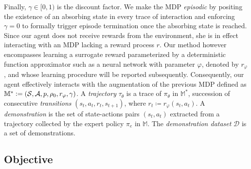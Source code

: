 Finally, $\gamma \in [0, 1)$ is the discount factor.
We make the MDP \emph{episodic}
by positing the existence of an absorbing state in every trace of interaction and
enforcing $\gamma = 0$ to formally trigger episode termination
once the absorbing state is reached.
Since our agent does not receive rewards from the environment,
she is in effect interacting with an MDP lacking a reward process $r$.
Our method however encompasses learning a surrogate reward parameterized
by a deterministic function approximator
such as a neural network with parameter $\varphi$, denoted by $r_\varphi$, and
whose learning procedure will be reported subsequently.
Consequently, our agent effectively interacts with the augmentation of the previous MDP defined as
$\mathbb{M}^* \vcentcolon= (\mathcal{S}, \mathcal{A}, p, \rho_0, r_\varphi, \gamma)$.
A \emph{trajectory} $\tau_\theta$ is a trace of $\pi_\theta$ in $\mathbb{M}^*$, succession of
consecutive \emph{transitions} $(s_t, a_t, r_t, s_{t+1})$,
where $r_t \coloneqq r_\varphi(s_t, a_t)$.
A \emph{demonstration} is the set of state-actions pairs $(s_t, a_t)$
extracted from a trajectory collected by the expert policy $\pi_e$
in $\mathbb{M}$.
The \emph{demonstration dataset} $\mathcal{D}$ is a set of demonstrations.

\subsection*{Objective}

